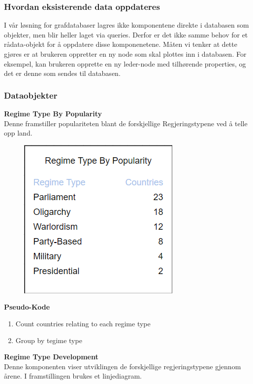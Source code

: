 \subsubsection{Hvordan eksisterende data oppdateres}
I vår løsning for grafdatabaser lagres ikke komponentene direkte i databasen som objekter, men blir 
heller laget via queries. Derfor er det ikke samme behov for et rådata-objekt for å oppdatere disse 
komponenetene. Måten vi tenker at dette gjøres er at brukeren oppretter en ny node som skal 
plottes inn i databasen. For eksempel, kan brukeren opprette en ny leder-node med tilhørende 
properties, og det er denne som sendes til databasen.

\subsubsection{Dataobjekter}
\textbf{Regime Type By Popularity}\\
Denne framstiller populariteten blant de forskjellige Regjeringstypene ved å telle opp land.

\FigureCounter
\begin{figure}[H]
  \includegraphics[scale=0.5]{images/milepael4/regimeTypeByPopularity.png}
\end{figure}

\textbf{Pseudo-Kode}
\begin{enumerate}
  \item Count countries relating to each regime type
  \item Group by tegime type
\end{enumerate}

\textbf{Regime Type Development}\\
Denne komponenten viser utviklingen de forskjellige regjeringstypene gjennom årene. I 
framstillingen brukes et linjediagram.

